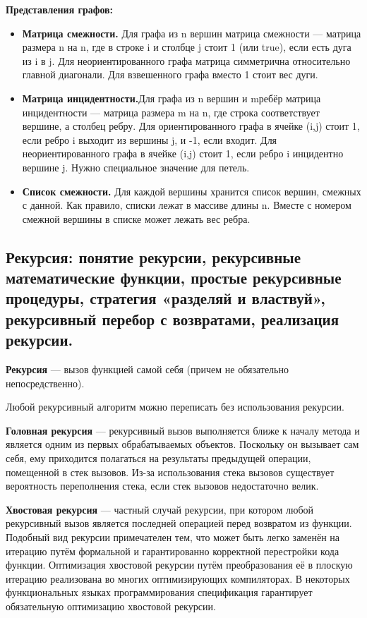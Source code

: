 \documentclass[12pt, a4paper]{article}
\begin{document}
\textbf{Представления графов: }

\begin{itemize}
    \item \textbf{Матрица смежности.} Для графа из n вершин матрица смежности — матрица размера n на n, где в строке i и столбце j стоит 1 (или true), если есть дуга из i в j. Для неориентированного графа матрица симметрична относительно главной диагонали. Для взвешенного графа вместо 1 стоит вес дуги.
    \item \textbf{Матрица инцидентности.}Для графа из n вершин и mребёр матрица
инцидентности — матрица размера m на n, где строка соответствует вершине, а столбец ребру.  Для ориентированного графа в ячейке (i,j) стоит 1, если ребро i выходит из вершины j, и -1, если входит. Для неориентированного графа в ячейке (i,j) стоит 1, если ребро i инцидентно вершине j. Нужно специальное значение для петель.
    \item \textbf{Список смежности.} Для каждой вершины хранится список вершин, смежных с данной. Как правило, списки лежат в массиве длины n. Вместе с номером смежной вершины в списке может лежать вес ребра.
\end{itemize}

\subsection{Рекурсия: понятие рекурсии, рекурсивные математические функции, простые рекурсивные процедуры, стратегия «разделяй и властвуй», рекурсивный перебор с возвратами, реализация рекурсии.}

\textbf{Рекурсия} --- вызов функцией самой себя (причем не обязательно непосредственно).

Любой рекурсивный алгоритм можно переписать без использования рекурсии.

\textbf{Головная рекурсия} — рекурсивный вызов выполняется ближе к началу метода и является одним из первых обрабатываемых объектов. Поскольку он вызывает сам себя, ему приходится полагаться на результаты предыдущей операции, помещенной в стек вызовов. Из-за использования стека вызовов существует вероятность переполнения стека, если стек вызовов недостаточно велик.

\textbf{Хвостовая рекурсия} — частный случай рекурсии, при котором любой рекурсивный вызов является последней операцией перед возвратом из функции. Подобный вид рекурсии примечателен тем, что может быть легко заменён на итерацию путём формальной и гарантированно корректной перестройки кода функции. Оптимизация хвостовой рекурсии путём преобразования её в плоскую итерацию реализована во многих оптимизирующих компиляторах. В некоторых функциональных языках программирования спецификация гарантирует обязательную оптимизацию хвостовой рекурсии.
\end{document}
